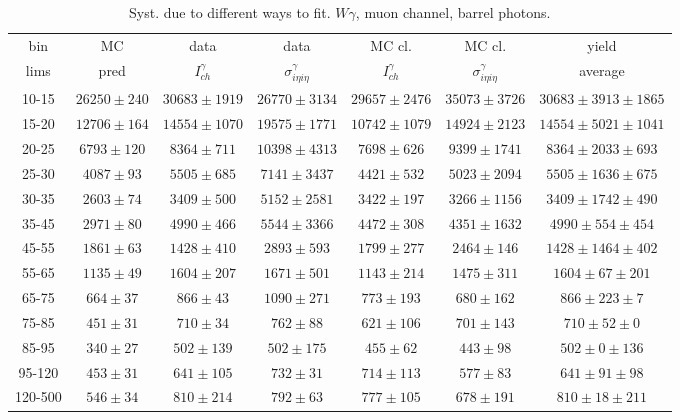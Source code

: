 \begin{table}[h]
  \tiny
  \begin{center}
  \caption{Syst. due to different ways to fit. $W\gamma$, muon channel, barrel photons.}
  \begin{tabular}{|c|c|c|c|c|c|c|}
    bin &  MC   & data  & data  & MC cl. & MC cl. & yield\\ 
    lims & pred & $I_{ch}^{\gamma}$ & $\sigma_{i\eta i\eta}^\gamma$  & $I_{ch}^{\gamma}$  & $\sigma_{i\eta i\eta}^\gamma$   & average \\ \hline
    10-15 & $26250\pm240$ & $30683\pm1919$ & $26770\pm3134$ & $29657\pm2476$ & $35073\pm3726$ &$30683\pm3913\pm1865$  \\ \hline
    15-20 & $12706\pm164$ & $14554\pm1070$ & $19575\pm1771$ & $10742\pm1079$ & $14924\pm2123$ &$14554\pm5021\pm1041$  \\ \hline
    20-25 & $6793\pm120$ & $8364\pm711$ & $10398\pm4313$ & $7698\pm626$ & $9399\pm1741$ &$8364\pm2033\pm693$  \\ \hline
    25-30 & $4087\pm93$ & $5505\pm685$ & $7141\pm3437$ & $4421\pm532$ & $5023\pm2094$ &$5505\pm1636\pm675$  \\ \hline
    30-35 & $2603\pm74$ & $3409\pm500$ & $5152\pm2581$ & $3422\pm197$ & $3266\pm1156$ &$3409\pm1742\pm490$  \\ \hline
    35-45 & $2971\pm80$ & $4990\pm466$ & $5544\pm3366$ & $4472\pm308$ & $4351\pm1632$ &$4990\pm554\pm454$  \\ \hline
    45-55 & $1861\pm63$ & $1428\pm410$ & $2893\pm593$ & $1799\pm277$ & $2464\pm146$ &$1428\pm1464\pm402$  \\ \hline
    55-65 & $1135\pm49$ & $1604\pm207$ & $1671\pm501$ & $1143\pm214$ & $1475\pm311$ &$1604\pm67\pm201$  \\ \hline
    65-75 & $664\pm37$ & $866\pm43$ & $1090\pm271$ & $773\pm193$ & $680\pm162$ &$866\pm223\pm7$  \\ \hline
    75-85 & $451\pm31$ & $710\pm34$ & $762\pm88$ & $621\pm106$ & $701\pm143$ &$710\pm52\pm0$  \\ \hline
    85-95 & $340\pm27$ & $502\pm139$ & $502\pm175$ & $455\pm62$ & $443\pm98$ &$502\pm0\pm136$  \\ \hline
    95-120 & $453\pm31$ & $641\pm105$ & $732\pm31$ & $714\pm113$ & $577\pm83$ &$641\pm91\pm98$  \\ \hline
    120-500 & $546\pm34$ & $810\pm214$ & $792\pm63$ & $777\pm105$ & $678\pm191$ &$810\pm18\pm211$  \\ \hline
  \end{tabular}
  \label{tab:diff_ways_to_fit_phoEt_BARREL_muon}
  \end{center}
\end{table}

